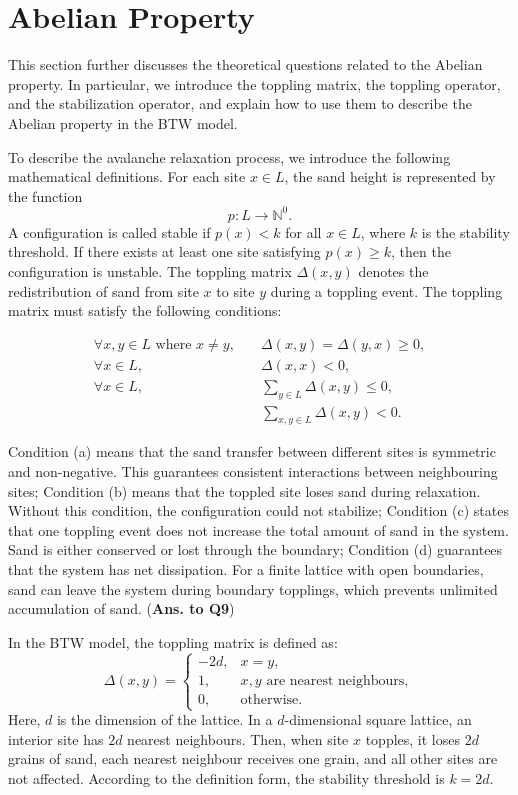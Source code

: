 \section{Abelian Property}

This section further discusses the theoretical questions related to the Abelian property. In particular, we introduce the toppling matrix, the toppling operator, and the stabilization operator, and explain how to use them to describe the Abelian property in the BTW model. 

To describe the avalanche relaxation process, we introduce the following mathematical definitions. For each site $x \in L$, the sand height is represented by the function
$$
p : L \rightarrow \mathbb{N}^{0}.
$$
A configuration is called stable if $p(x) < k$ for all $x \in L$, where $k$ is the stability threshold. If there exists at least one site satisfying $p(x) \ge k$, then the configuration is unstable. The toppling matrix $\Delta(x,y)$ denotes the redistribution of sand from site $x$ to site $y$ during a toppling event. The toppling matrix must satisfy the following conditions:

\begin{align}
\forall x,y \in L \text{ where } x \neq y, \quad
&\Delta(x,y) = \Delta(y,x) \ge 0, \tag{a} \\
\forall x \in L, \quad
&\Delta(x,x) < 0, \tag{b} \\
\forall x \in L, \quad
&\sum_{y \in L} \Delta(x,y) \le 0, \tag{c} \\
&\sum_{x,y \in L} \Delta(x,y) < 0. \tag{d}
\end{align}

Condition (a) means that the sand transfer between different sites is symmetric and non-negative. This guarantees consistent interactions between neighbouring sites; Condition (b) means that the toppled site loses sand during relaxation. Without this condition, the configuration could not stabilize; Condition (c) states that one toppling event does not increase the total amount of sand in the system. Sand is either conserved or lost through the boundary; Condition (d) guarantees that the system has net dissipation. For a finite lattice with open boundaries, sand can leave the system during boundary topplings, which prevents unlimited accumulation of sand. (\textbf{Ans. to Q9})

In the BTW model, the toppling matrix is defined as: 
$$
\Delta(x,y)=
\begin{cases}
-2d, & x=y,\\
1, & x,y \text{ are nearest neighbours},\\
0, & \text{otherwise}.
\end{cases}
$$
Here, $d$ is the dimension of the lattice. In a $d$-dimensional square lattice, an interior site has $2d$ nearest neighbours. Then, when site $x$ topples, it loses $2d$ grains of sand, each nearest neighbour receives one grain, and all other sites are not affected. According to the definition form, the stability threshold is $k = 2d$. 

